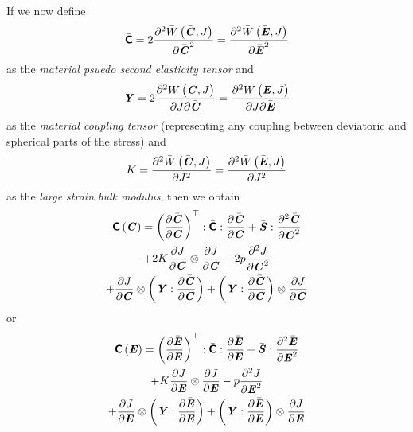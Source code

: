 If we now define
\begin{equation}
  \bar{\tensorfour{C}}=2\deltwosqby{\fnof{\bar{W}}{\bar{\tensor{C}},J}}{\bar{\tensor{C}}}=\deltwosqby{\fnof{\bar{W}}{\bar{\tensor{E}},J}}{\bar{\tensor{E}}}
\end{equation}
as the \emph{material psuedo second elasticity
  tensor} and
\begin{equation}
  \tensor{Y}=2\deltwoby{\fnof{\bar{W}}{\bar{\tensor{C}},J}}{J}{\bar{\tensor{C}}}=\deltwoby{\fnof{\bar{W}}{\bar{\tensor{E}},J}}{J}{\bar{\tensor{E}}}
\end{equation}
as the \emph{material coupling tensor} (\ie representing any coupling between
deviatoric and spherical parts of the stress) and
\begin{equation}
  K=\deltwosqby{\fnof{\bar{W}}{\bar{\tensor{C}},J}}{J}=\deltwosqby{\fnof{\bar{W}}{\bar{\tensor{E}},J}}{J}
\end{equation}
as the \emph{large strain bulk modulus}, then we obtain
\begin{multline}
  \fnof{\tensorfour{C}}{\tensor{C}}=\doubledotprodthree{\transpose{\pbrac{\delby{\bar{\tensor{C}}}{\tensor{C}}}}}{\bar{\tensorfour{C}}}{\delby{\bar{\tensor{C}}}{\tensor{C}}}+\doubledotprod{\bar{\tensor{S}}}{\deltwosqby{\bar{\tensor{C}}}{\tensor{C}}}\\
  +2K\tensorprod{\delby{J}{\tensor{C}}}{\delby{J}{\tensor{C}}}-2p\deltwosqby{J}{\tensor{C}}\\
  +\tensorprod{\delby{J}{\tensor{C}}}{\pbrac{\doubledotprod{\tensor{Y}}{\delby{\bar{\tensor{C}}}{\tensor{C}}}}}+\tensorprod{\pbrac{\doubledotprod{\tensor{Y}}{\delby{\bar{\tensor{C}}}{\tensor{C}}}}}{\delby{J}{\tensor{C}}}
\end{multline}
or
\begin{multline}
  \fnof{\tensorfour{C}}{\tensor{E}}=\doubledotprodthree{\transpose{\pbrac{\delby{\bar{\tensor{E}}}{\tensor{E}}}}}{\bar{\tensorfour{C}}}{\delby{\bar{\tensor{E}}}{\tensor{E}}}+\doubledotprod{\bar{\tensor{S}}}{\deltwosqby{\bar{\tensor{E}}}{\tensor{E}}}\\
  +K\tensorprod{\delby{J}{\tensor{E}}}{\delby{J}{\tensor{E}}}-p\deltwosqby{J}{\tensor{E}}\\
  +\tensorprod{\delby{J}{\tensor{E}}}{\pbrac{\doubledotprod{\tensor{Y}}{\delby{\bar{\tensor{E}}}{\tensor{E}}}}}+\tensorprod{\pbrac{\doubledotprod{\tensor{Y}}{\delby{\bar{\tensor{E}}}{\tensor{E}}}}}{\delby{J}{\tensor{E}}}
\end{multline}

